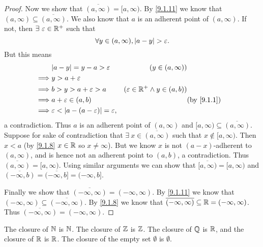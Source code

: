 \begin{proof}
  Now we show that \(\overline{(a, \infty)} = [a, \infty)\).
  By \cref{9.1.11} we know that \((a, \infty) \subseteq \overline{(a, \infty)}\).
  We also know that \(a\) is an adherent point of \((a, \infty)\).
  If not, then \(\exists\ \varepsilon \in \mathbb{R}^+\) such that
  \[
    \forall y \in (a, \infty), \left\lvert a - y\right\rvert > \varepsilon.
  \]
  But this means
  \begin{align}
             & \abs{a - y} = y - a > \varepsilon                        & (y \in (a, \infty))                                                  \\
    \implies & y > a + \varepsilon                                                                                                             \\
    \implies & b > y > a + \varepsilon > a                              & (\varepsilon \in \R^+ \land y \in (a, b))                            \\
    \implies & a + \varepsilon \in (a, b)                               &                                           & \text{(by \cref{9.1.1})} \\
    \implies & \varepsilon < \abs{a - (a - \varepsilon)} = \varepsilon,
  \end{align}
  a contradiction.
  Thus \(a\) is an adherent point of \((a, \infty)\) and \([a, \infty) \subseteq \overline{(a, \infty)}\).
  Suppose for sake of contradiction that \(\exists\ x \in \overline{(a, \infty)}\) such that \(x \notin [a, \infty)\).
  Then \(x < a\) (by \cref{9.1.8} \(x \in \mathbb{R}\) so \(x \neq \infty\)).
  But we know \(x\) is not \((a - x)\)-adherent to \((a, \infty)\), and is hence not an adherent point to \((a, b)\), a contradiction.
  Thus \(\overline{(a, \infty)} = [a, \infty)\).
  Using similar arguments we can show that \(\overline{[a, \infty)} = [a, \infty)\) and \(\overline{(-\infty, b)} = \overline{(-\infty, b]} = (-\infty, b]\).

  Finally we show that \(\overline{(-\infty, \infty)} = (-\infty, \infty)\).
  By \cref{9.1.11} we know that \((-\infty, \infty) \subseteq \overline{(-\infty, \infty)}\).
  By \cref{9.1.8} we know that \(\overline{(-\infty, \infty)} \subseteq \mathbb{R} = (-\infty, \infty)\).
  Thus \(\overline{(-\infty, \infty)} = (-\infty, \infty)\).
\end{proof}

\begin{lem}\label{9.1.13}
  The closure of \(\mathbb{N}\) is \(\mathbb{N}\).
  The closure of \(\mathbb{Z}\) is \(\mathbb{Z}\).
  The closure of \(\mathbb{Q}\) is \(\mathbb{R}\), and the closure of \(\mathbb{R}\) is \(\mathbb{R}\).
  The closure of the empty set \(\emptyset\) is \(\emptyset\).
\end{lem}


